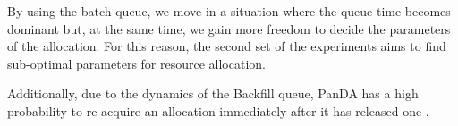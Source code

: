 By using the batch queue, we move in a situation where the queue time becomes dominant but, at the same time, we gain more freedom to decide the parameters of the allocation. For this reason, the second set of the experiments aims to find sub-optimal parameters for resource allocation.

Additionally, due to the dynamics of the Backfill queue, PanDA has a high probability to re-acquire an allocation immediately after it has released one .
